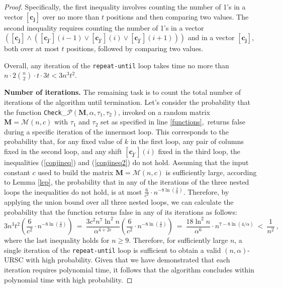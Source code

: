 \documentclass[11pt]{article}
\begin{document}
\begin{proof}
Specifically, the first inequality involves counting the number of 1's in a vector $\mathbf{[c_j]}$ 
over no more than $t$ positions and then comparing two values. 
The second inequality requires counting the number of 1's in a 
vector $\left( \mathbf{[c_j]} \land (\mathbf{[c_{j'}]}(i-1) \lor \mathbf{[c_{j'}]}(i) \lor \mathbf{[c_{j'}]}(i+1) ) \right)$ and in a vector $\mathbf{[c_j]}$, both over at most $t$ positions, 
followed by comparing two values.


Overall, any iteration of the \texttt{repeat-until} loop takes time no more than 
$n\cdot 2\binom{n}{2} \cdot t \cdot 3 t < 
3 n^3 t^2$. 

\medskip
\textbf{Number of iterations.}
The remaining task is to count the total number of iterations of the algorithm until termination.
Let's consider the probability that the function 
\texttt{Check}\_$\mathcal{P}(\mathbf{M}, \alpha, \tau_1, \tau_2)$, invoked on a random matrix $\mathbf{M} = \mathcal{M}(n,c)$ 
with $\tau_1$ and $\tau_2$ set as specified in line \ref{functions}$,$ returns {\sc false} during a specific iteration of the innermost loop. 
This corresponds to the probability that, for any fixed value of $k$ in the first loop, 
any pair of columns fixed in the second loop, and any shift $\mathbf{[c_{j'}]}(i)$ fixed in the third loop, 
the inequalities (\ref{conjineq}) and (\ref{conjineq2}) do not hold.              
Assuming that the input constant $c$ used to build the matrix $\mathbf{M} = {\mathcal{M}}(n,c)$ 
is sufficiently large, 
according to Lemma \ref{lep}, the probability that in any of the iterations of the three nested loops the inequalities do not hold, is at most 
$\frac{6}{c^2}\cdot  n^{-8\ln\left(\frac{4}{\alpha}\right)}$. 
Therefore, by applying the union bound over all three nested loops, we can calculate 
the probability that the function returns {\sc false} in any of its iterations as follows:
\[
3 n^3 t^2 
        \left(\frac{6}{c^2}\cdot  n^{-8\ln\left(\frac{4}{\alpha}\right)}\right)
\ = \ 
    \frac{3 c^2 n^7 \ln^2 n}{\alpha^{4+2\epsilon}} 
         \left(\frac{6}{c^2}\cdot  n^{-8\ln\left(\frac{4}{\alpha}\right)}\right) 
\ = \ 
    \frac{18 \ln^2 n}{\alpha^6} \cdot n^{7 - 8\ln(4/\alpha)}  
\ < \ 
    \frac{1}{n^2}
    \ ,
\]
where the last inequality holds for $n \ge 9$.
Therefore, for sufficiently large $n$, a single iteration of the \texttt{repeat-until} loop 
is sufficient to obtain a valid $(n,\alpha)$-URSC 
with high probability. Given that we have demonstrated that each iteration requires polynomial time, 
it follows that the algorithm concludes within polynomial time with high probability.


\end{proof}
\end{document}
